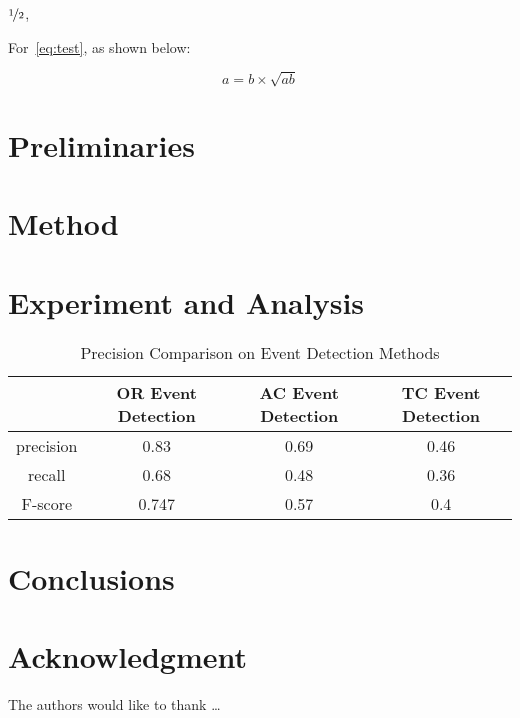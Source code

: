 \documentclass{amsart}
\theoremstyle{definition}
\theoremstyle{remark}
\numberwithin{equation}{section}
\begin{document}
$\nicefrac[]{1}{2}$,


For~\cref{eq:test}, 
as shown below:

\begin{equation}\label{eq:test}
a = b \times \sqrt{ab}
\end{equation}

\section{Preliminaries} \label{sec-preliminaries}

\lipsum


\section{Method} \label{sec-method}

\section{Experiment and Analysis} \label{sec-experiment}

\begin{table}  \centering
  \caption{Precision Comparison on Event Detection Methods}
  \label{tbl:overall-experiments}
  \begin{tabular}{cccc}
\toprule
    & OR Event Detection & AC Event Detection & TC Event Detection \\
\midrule
    precision & 0.83 & 0.69 & 0.46 \\
    recall & 0.68 & 0.48 & 0.36 \\
    F-score & 0.747 & 0.57 & 0.4 \\
\bottomrule
\end{tabular}
\end{table}

\section{Conclusions} \label{sec-conclusions}

\section*{Acknowledgment}

The authors would like to thank \ldots

\newpage


\end{document}
